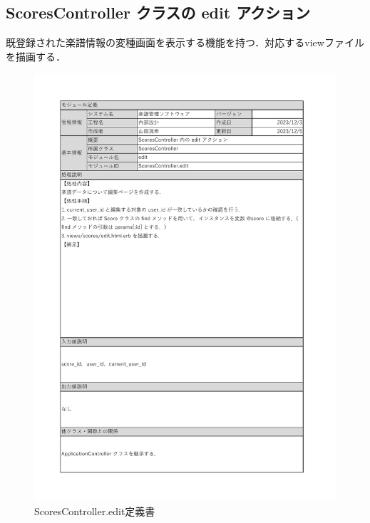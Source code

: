 \subsection*{ScoresController クラスの edit アクション}
既登録された楽譜情報の変種画面を表示する機能を持つ．対応するviewファイルを描画する．
\begin{figure}[H]
	\centering
	\includegraphics[scale=0.6]{img/Scores/xlsx/ScoresController_edit.pdf}
	\vspace{-1cm}
	\caption{ScoresController.edit定義書}
\end{figure}
